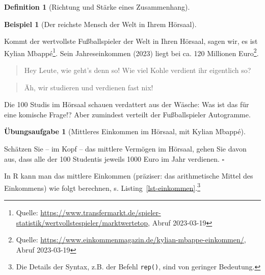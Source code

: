 \documentclass[
  a4paper,
  DIV=11]{scrreprt}
\theoremstyle{definition}
\newtheorem{exercise}{Übungsaufgabe}[chapter]
\theoremstyle{definition}
\newtheorem{example}{Beispiel}[chapter]
\theoremstyle{definition}
\newtheorem{definition}{Definition}[chapter]
\theoremstyle{remark}
\begin{document}
\begin{definition}[Richtung und Stärke eines
Zusammenhang]
\begin{example}[Der reichste Mensch der Welt in Ihrem
Hörsaal]\protect\hypertarget{exm-md}{}\label{exm-md}

Kommt der wertvollste Fußballspieler der Welt in Ihren Hörsaal, sagen
wir, es ist Kylian Mbappé\footnote{Quelle:
  \url{https://www.transfermarkt.de/spieler-statistik/wertvollstespieler/marktwertetop},
  Abruf 2023-03-19}. Sein Jahreseinkommen (2023) liegt bei ca. 120
Millionen Euro\footnote{Quelle:
  \url{https://www.einkommenmagazin.de/kylian-mbappe-einkommen/}, Abruf
  2023-03-19}.

\begin{quote}
{} Hey Leute, wie geht's denn so! Wie viel Kohle
verdient ihr eigentlich so?
\end{quote}

\begin{quote}
{} Äh, wir studieren und verdienen fast nix!
\end{quote}

Die 100 Studis im Hörsaal schauen verdattert aus der Wäsche: Was ist das
für eine komische Frage!? Aber zumindest verteilt der Fußballspieler
Autogramme.

\end{example}

\begin{exercise}[Mittleres Einkommen im Hörsaal, mit Kylian
Mbappé]\protect\hypertarget{exr-elon}{}\label{exr-elon}

Schätzen Sie -- im Kopf -- das mittlere Vermögen im Hörsaal, gehen Sie
davon aus, dass alle der 100 Studentis jeweils 1000 Euro im Jahr
verdienen. \(\square\)

\end{exercise}

In R kann man das mittlere Einkommen (präziser: das arithmetische Mittel
des Einkommens) wie folgt berechnen, s.
Listing~\ref{lst-einkommen}.\footnote{Die Details der Syntax, z.B. der
  Befehl \texttt{rep()}, sind von geringer Bedeutung.}

\begin{codelisting}

\caption{\label{lst-einkommen}Wir simulieren Einkommen von 100 Studis
plus Mbappé.}

\centering{

}
\end{codelisting}
\end{definition}
\end{document}
